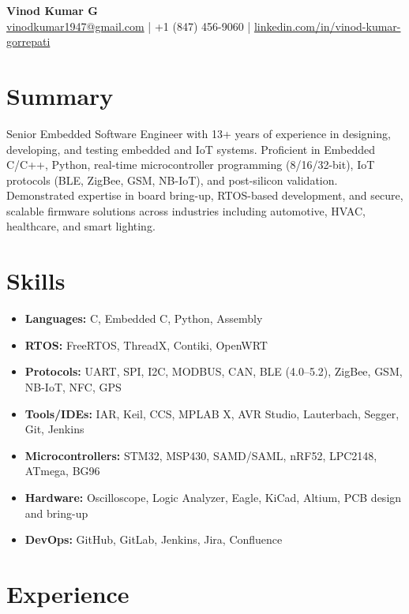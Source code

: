 \documentclass[10pt]{article}
\begin{document}
\begin{center}
    {\Huge \textbf{Vinod Kumar G}} \\[4pt]
    \href{mailto:vinodkumar1947@gmail.com}{vinodkumar1947@gmail.com} \quad | \quad +1 (847) 456-9060 \quad | \quad \href{https://www.linkedin.com/in/vinod-kumar-gorrepati}{linkedin.com/in/vinod-kumar-gorrepati}
\end{center}

\vspace{1em}

\section*{Summary}
Senior Embedded Software Engineer with 13+ years of experience in designing, developing, and testing embedded and IoT systems. Proficient in Embedded C/C++, Python, real-time microcontroller programming (8/16/32-bit), IoT protocols (BLE, ZigBee, GSM, NB-IoT), and post-silicon validation. Demonstrated expertise in board bring-up, RTOS-based development, and secure, scalable firmware solutions across industries including automotive, HVAC, healthcare, and smart lighting.

\section*{Skills}
\begin{itemize}[leftmargin=*]
  \item \textbf{Languages:} C, Embedded C, Python, Assembly
  \item \textbf{RTOS:} FreeRTOS, ThreadX, Contiki, OpenWRT
  \item \textbf{Protocols:} UART, SPI, I2C, MODBUS, CAN, BLE (4.0–5.2), ZigBee, GSM, NB-IoT, NFC, GPS
  \item \textbf{Tools/IDEs:} IAR, Keil, CCS, MPLAB X, AVR Studio, Lauterbach, Segger, Git, Jenkins
  \item \textbf{Microcontrollers:} STM32, MSP430, SAMD/SAML, nRF52, LPC2148, ATmega, BG96
  \item \textbf{Hardware:} Oscilloscope, Logic Analyzer, Eagle, KiCad, Altium, PCB design and bring-up
  \item \textbf{DevOps:} GitHub, GitLab, Jenkins, Jira, Confluence
\end{itemize}

\section*{Experience}
\end{document}
